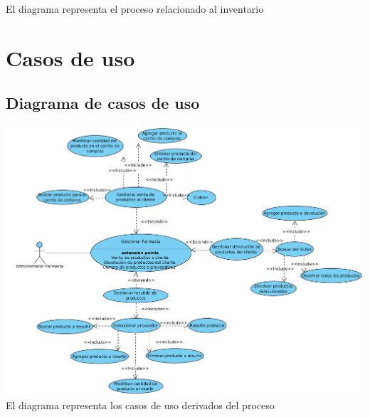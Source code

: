 \begin{flushleft}
\begin{center}
	\normalsize{El diagrama representa el proceso relacionado al inventario}
	\end{center}
		

	\newpage
	\section{Casos de uso}
	
	\subsection{Diagrama de casos de uso}
	\begin{center}

		\includegraphics[width=16cm]{proceso/images/x.casosuso.png}\\	

		\normalsize{El diagrama representa los casos de uso derivados del proceso}
	\end{center}
	

\end{flushleft}